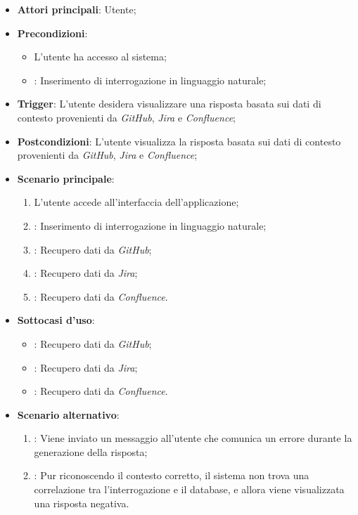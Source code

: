 \begin{itemize}
    \item \textbf{Attori principali}: Utente;
    \item \textbf{Precondizioni}: 
    \begin{itemize}
        \item L'utente ha accesso al sistema;
        \item {}: Inserimento di interrogazione in linguaggio naturale;
    \end{itemize}
    \item \textbf{Trigger}: L'utente desidera visualizzare una risposta basata sui dati di contesto provenienti da \emph{GitHub}, \emph{Jira} e \emph{Confluence};
    \item \textbf{Postcondizioni}: L'utente visualizza la risposta basata sui dati di contesto provenienti da \emph{GitHub}, \emph{Jira} e \emph{Confluence};
    \item \textbf{Scenario principale}:
    \begin{enumerate}
        \item L'utente accede all'interfaccia dell'applicazione;
        \item {}: Inserimento di interrogazione in linguaggio naturale;
        \item {}: Recupero dati da \emph{GitHub};
        \item {}: Recupero dati da \emph{Jira};
        \item {}: Recupero dati da \emph{Confluence}.
    \end{enumerate}
    \item \textbf{Sottocasi d'uso}:
    \begin{itemize}
        \item {}: Recupero dati da \emph{GitHub};
        \item {}: Recupero dati da \emph{Jira};
        \item {}: Recupero dati da \emph{Confluence}.
    \end{itemize}
    \item \textbf{Scenario alternativo}:
    \begin{enumerate}
        \item {}: Viene inviato un messaggio all'utente che comunica un errore durante la generazione della risposta;
        \item {}: Pur riconoscendo il contesto corretto, il sistema non trova una correlazione tra l'interrogazione e il database, e allora viene visualizzata una risposta negativa.
    \end{enumerate}
\end{itemize}

